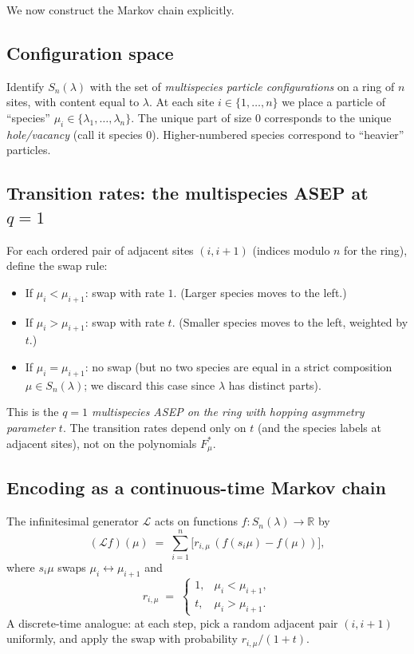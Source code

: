 We now construct the Markov chain explicitly.

\subsection*{Configuration space}

Identify $S_n(\lambda)$ with the set of \emph{multispecies particle configurations} on a ring of $n$ sites, with content equal to $\lambda$.  At each site $i\in\{1,\ldots,n\}$ we place a particle of ``species'' $\mu_i\in\{\lambda_1,\ldots,\lambda_n\}$.  The unique part of size $0$ corresponds to the unique \emph{hole/vacancy} (call it species $0$).  Higher-numbered species correspond to ``heavier'' particles.

\subsection*{Transition rates: the multispecies ASEP at $q=1$}

For each ordered pair of adjacent sites $(i,i+1)$ (indices modulo $n$ for the ring), define the swap rule:
\begin{itemize}\setlength\itemsep{2pt}
\item If $\mu_i<\mu_{i+1}$: swap with rate $1$.  (Larger species moves to the left.)
\item If $\mu_i>\mu_{i+1}$: swap with rate $t$.  (Smaller species moves to the left, weighted by $t$.)
\item If $\mu_i=\mu_{i+1}$: no swap (but no two species are equal in a strict composition $\mu\in S_n(\lambda)$; we discard this case since $\lambda$ has distinct parts).
\end{itemize}

This is the \emph{$q=1$ multispecies ASEP on the ring with hopping asymmetry parameter $t$}.  The transition rates depend only on $t$ (and the species labels at adjacent sites), not on the polynomials $F^*_\mu$.

\subsection*{Encoding as a continuous-time Markov chain}

The infinitesimal generator $\mathcal L$ acts on functions $f:S_n(\lambda)\to\mathbb R$ by
\[
(\mathcal L f)(\mu) \;=\; \sum_{i=1}^n \bigl[r_{i,\mu}\,(f(s_i\mu)-f(\mu))\bigr],
\]
where $s_i\mu$ swaps $\mu_i\leftrightarrow\mu_{i+1}$ and
\[
r_{i,\mu}\;=\;\begin{cases}1,&\mu_i<\mu_{i+1},\\ t,&\mu_i>\mu_{i+1}.\end{cases}
\]
A discrete-time analogue: at each step, pick a random adjacent pair $(i,i+1)$ uniformly, and apply the swap with probability $r_{i,\mu}/(1+t)$.

